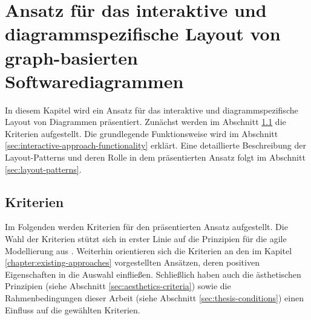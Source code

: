 
\chapter{Ansatz für das interaktive und diagrammspezifische Layout von graph-basierten Softwarediagrammen}
\label{chapter:interactive-approach}

In diesem Kapitel wird ein Ansatz für das interaktive und diagrammspezifische Layout von Diagrammen präsentiert. Zunächst werden im Abschnitt \ref{sec:requirements-analysis} die Kriterien aufgestellt. Die grundlegende Funktionsweise wird im Abschnitt \ref{sec:interactive-approach-functionality} erklärt. Eine detaillierte Beschreibung der Layout-Patterns und deren Rolle in dem präsentierten Ansatz folgt im Abschnitt \ref{sec:layout-patterns}.

\section{Kriterien}
\label{sec:requirements-analysis}

Im Folgenden werden Kriterien für den präsentierten Ansatz aufgestellt. Die Wahl der Kriterien stützt sich in erster Linie auf die Prinzipien für die agile Modellierung aus \cite{Ambler02Agile}. Weiterhin orientieren sich die Kriterien an den im Kapitel \ref{chapter:existing-approaches} vorgestellten Ansätzen, deren positiven Eigenschaften in die Auswahl einfließen.   Schließlich haben auch die ästhetischen Prinzipien (siehe Abschnitt \ref{sec:aesthetics-criteria}) sowie die Rahmenbedingungen dieser Arbeit (siehe Abschnitt \ref{sec:thesis-conditions}) einen Einfluss auf die gewählten Kriterien.

